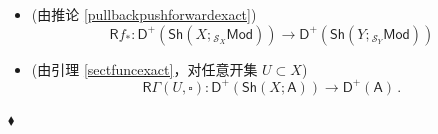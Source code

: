 \begin{Ex}
\begin{itemize}[leftmargin=0.5cm]
	\item (由推论 \ref{pullbackpushforwardexact})
	\begin{equation}\label{Rflowerstar}
		\mathsf{R}f_*:\mathsf{D^+}(\mathsf{Sh}(X;{}_{\mathcal{S}_X}\!\mathsf{Mod}))\rightarrow\mathsf{D^+}(\mathsf{Sh}(Y;{}_{\mathcal{S}_Y}\!\mathsf{Mod}))
	\end{equation} 
	
	\item (由引理 \ref{sectfuncexact}，对任意开集 $U\subset X$) 
	\begin{equation}\label{RGammaU}
		\mathsf{R}\Gamma(U,\square):\mathsf{D^+}(\mathsf{Sh}(X;\mathsf{A}))\rightarrow\mathsf{D^+(A)}\,.
	\end{equation}	  
\end{itemize}\vspace*{-0.2cm}
\hfill $\blacklozenge$ 
\end{Ex}

